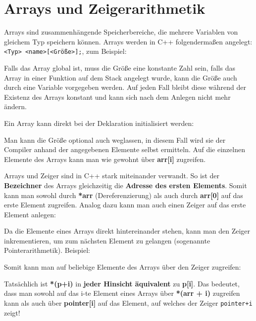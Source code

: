 \section{\ExercisePrefixMemory Arrays und Zeigerarithmetik}
\label{sec:arrays}
Arrays sind zusammenhängende Speicherbereiche, die mehrere Variablen von gleichem Typ speichern können.
Arrays werden in C++ folgendermaßen angelegt: \lstinline{<Typ> <name>[<Größe>];}, zum Beispiel:


Falls das Array global ist, muss die Größe eine konstante Zahl sein, falls das Array in einer Funktion auf dem Stack angelegt wurde, kann die Größe auch durch eine Variable vorgegeben werden.
Auf jeden Fall bleibt diese während der Existenz des Arrays konstant und kann sich nach dem Anlegen nicht mehr ändern.

Ein Array kann direkt bei der Deklaration initialisiert werden:


Man kann die Größe optional auch weglassen, in diesem Fall wird sie der Compiler anhand der angegebenen Elemente selbst ermitteln. Auf die einzelnen Elemente des Arrays kann man wie gewohnt über \textbf{arr[i]} zugreifen.

Arrays und Zeiger sind in C++ stark miteinander verwandt.
So ist der \textbf{Bezeichner} des Arrays gleichzeitig die \textbf{Adresse des ersten Elements}.
Somit kann man sowohl durch \textbf{*arr} (Dereferenzierung) als auch durch \textbf{arr[0]} auf das erste Element zugreifen.
Analog dazu kann man auch einen Zeiger auf das erste Element anlegen:


Da die Elemente eines Arrays direkt hintereinander stehen, kann man den Zeiger inkrementieren, um zum  nächsten Element zu gelangen (sogenannte Pointerarithmetik).
Beispiel:


Somit kann man auf beliebige Elemente des Arrays über den Zeiger zugreifen:


Tatsächlich ist \textbf{*(p+i)} in \textbf{jeder Hinsicht äquivalent} zu \textbf{p[i]}.
Das bedeutet, dass man sowohl auf das i-te Element eines Arrays über \textbf{*(arr + i)} zugreifen kann als auch über \textbf{pointer[i]} auf das Element, auf welches der Zeiger \lstinline{pointer+i} zeigt!

